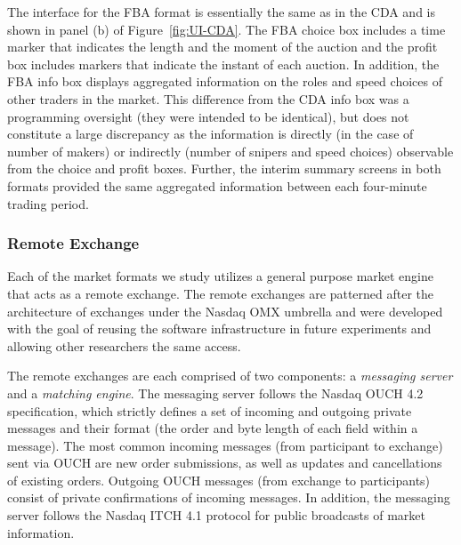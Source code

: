 \documentclass[12pt]{article}
\begin{document}
The interface for the FBA format is essentially the same as in the CDA and is shown in panel (b) of Figure~\ref{fig:UI-CDA}.  The FBA choice box includes a time marker that indicates the length and the moment of the auction and the profit box includes markers that indicate the instant of each auction. In addition, the FBA info box displays aggregated information on the roles and speed choices of other traders in the market. This difference from the CDA info box was a programming oversight (they were intended to be identical), but does not constitute a large discrepancy as the information is directly (in the case of number of makers) or indirectly (number of snipers and speed choices) observable from the choice and profit boxes. Further, the interim summary screens in both formats provided the same aggregated information between each four-minute trading period. 

\subsubsection{Remote Exchange}

Each of the market formats we study utilizes a general purpose market engine that acts as a remote exchange. The remote exchanges are patterned after the architecture of exchanges under the Nasdaq OMX umbrella and were developed with the goal of reusing the software infrastructure in future experiments and allowing other researchers the same access.

The remote exchanges are each comprised of two components: a \textit{messaging server} and a \textit{matching engine}. The messaging server follows the Nasdaq OUCH 4.2 specification, which strictly defines a set of incoming and outgoing private messages and their format (the order and byte length of each field within a message). The most common incoming messages (from participant to exchange) sent via OUCH are new order submissions, as well as updates and cancellations of existing orders. Outgoing OUCH messages (from exchange to participants) consist of private confirmations of incoming messages. In addition, the messaging server follows the Nasdaq ITCH 4.1 protocol for public broadcasts of market information. 
\end{document}
